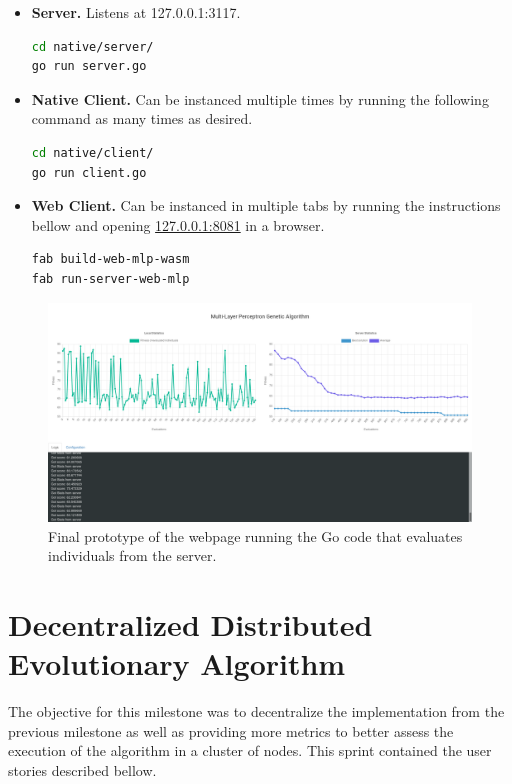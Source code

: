 \begin{itemize}
	\item \textbf{Server.} Listens at 127.0.0.1:3117.
\begin{lstlisting}[language=bash]
cd native/server/
go run server.go
\end{lstlisting}

	\item \textbf{Native Client.} Can be instanced multiple times by running the following command as many times as desired.
\begin{lstlisting}[language=bash]
cd native/client/
go run client.go
\end{lstlisting}

	\item \textbf{Web Client.} Can be instanced in multiple tabs by running the instructions bellow and opening \href{127.0.0.1:8081}{127.0.0.1:8081} in a browser.
\begin{lstlisting}[language=bash]
fab build-web-mlp-wasm
fab run-server-web-mlp
\end{lstlisting}
\end{itemize}

\begin{figure}[h!]
		\centering
    	\includegraphics[width=\linewidth]{assets/images/web-milestone2.png}
    	\caption{Final prototype of the webpage running the Go code that evaluates individuals from the server.}
    	\label{image:web-milestone2}
\end{figure}

\section{Decentralized Distributed Evolutionary Algorithm}

The objective for this milestone was to decentralize the implementation from the previous milestone as well as providing more metrics to better assess the execution of the algorithm in a cluster of nodes. This sprint contained the user stories described bellow.

